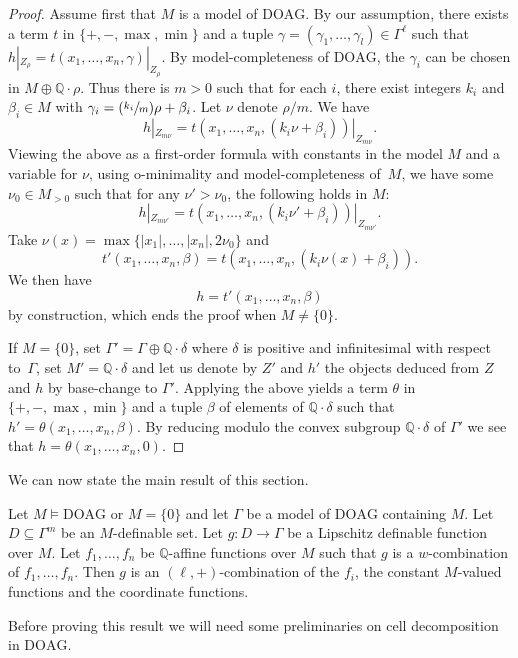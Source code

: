 \documentclass[JEP,XML,SOM,Unicode,ThmDefs,NoEqCountersInSection,published]{cedram}
\newcommand{\Psfrac}[2]{(\sfrac{#1}{#2})}
\newcommand{\DOAG}{\mathrm{DOAG}}
\newcommand{\Q}{\mathbb Q}
\theoremstyle{plain}
\theoremstyle{definition}
\begin{document}
\begin{proof}
Assume first that $M$ is
a model of $\DOAG$. By our assumption,
there exists a term $t$ in $\{+,-,\max,\min\}$ and
a tuple
$\gamma=(\gamma_1,\ldots,\gamma_l)\in \Gamma^\ell$
such that $h|_{Z_\rho}=t(x_1,\ldots,x_n,\gamma)|_{Z_\rho}$.
By model-completeness of $\DOAG$, the $\gamma_i$ can be chosen in
$M\oplus \Q\cdot \rho$.
Thus there is $m>0$ such that for each $i$, there exist integers $k_i$ and $\beta_i\in M$
with $\gamma_i=\Psfrac{k_i}{m}\rho+\beta_i$. Let $\nu$ denote $\rho/m$.
We have
\[
h|_{Z_{m\nu}}=t(x_1,\ldots,x_n,(k_i\nu+\beta_i))|_{Z_{m\nu}}.
\]
Viewing the above as a first-order formula with constants in
the model $M$ and a variable for $\nu$, using o-minimality
and model-completeness of~$M$, we have some $\nu_0\in M_{>0}$ such that for any $\nu'>\nu_0$, the following holds in $M$:
\[
h|_{Z_{m\nu'}}=t(x_1,\ldots,x_n,(k_i\nu'+\beta_i))|_{Z_{m\nu'}}.
\]
Take $\nu(x)=\max \{|x_1|,\ldots,|x_n|,2\nu_0\}$ and
\[
t'(x_1,\ldots,x_n,\beta)=t(x_1,\ldots,x_n,(k_i\nu(x)+\beta_i)).
\]
We then have
\[
h=t'(x_1,\ldots,x_n,\beta)
\]
by construction, which ends the proof when $M\neq \{0\}$.

If $M=\{0\}$,
set $\Gamma'=\Gamma\oplus \Q\cdot \delta$ where $\delta$ is positive
and infinitesimal with respect to~$\Gamma$, set $M'=\Q\cdot \delta$ and
let us denote
by $Z'$ and $h'$ the objects
deduced from $Z$ and $h$ by base-change to $\Gamma'$.
Applying the above yields
a
term
$\theta$ in $\{+,-,\max,\min\}$
and a tuple $\beta$
of elements of $\Q\cdot \delta$ such that $h'=\theta(x_1,\ldots,x_n,\beta)$.
By reducing modulo the convex subgroup $\Q\cdot \delta$ of $\Gamma'$
we see that $h=\theta(x_1,\ldots,x_n,0)$.
\end{proof}

We can now state the main result of this section.

\begin{theo}\label{thm:lip-t-gen}
Let $M\models \DOAG$ or $M=\{0\}$ and
let $\Gamma$ be a model of
$\DOAG$ containing $M$.
Let $D\subseteq \Gamma^m$ be an $M$-definable set. Let $g:D\to \Gamma$ be a Lipschitz definable function over $M$. Let $f_1,\ldots,f_n$ be $\Q$-affine functions over $M$ such that $g$ is a $w$-combination of $f_1,\ldots,f_n$. Then $g$ is an $(\ell, +)$-combination of the $f_i$,
the constant $M$-valued functions and the coordinate functions.
\end{theo}

Before proving this result we will need some preliminaries on cell decomposition in $\DOAG$.
\end{document}
